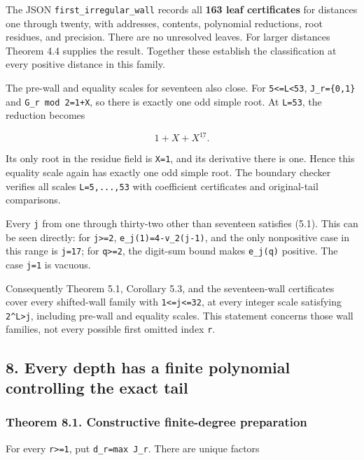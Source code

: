 \documentclass[11pt,letterpaper]{article}
\begin{document}
The JSON \texttt{first\_irregular\_wall} records all \textbf{163 leaf certificates} for distances one through twenty, with addresses, contents, polynomial reductions, root residues, and precision. There are no unresolved leaves. For larger distances Theorem 4.4 supplies the result. Together these establish the classification at every positive distance in this family.

The pre-wall and equality scales for seventeen also close. For \texttt{5\textless{}=L\textless{}53}, \texttt{J\_r=\{0,1\}} and \texttt{G\_r\ mod\ 2=1+X}, so there is exactly one odd simple root. At \texttt{L=53}, the reduction becomes

\[
1+X+X^{\underline{17}}.
\]

Its only root in the residue field is \texttt{X=1}, and its derivative there is one. Hence this equality scale again has exactly one odd simple root. The boundary checker verifies all scales \texttt{L=5,...,53} with coefficient certificates and original-tail comparisons.

Every \texttt{j} from one through thirty-two other than seventeen satisfies (5.1). This can be seen directly: for \texttt{j\textgreater{}=2}, \texttt{e\_j(1)=4-v\_2(j-1)}, and the only nonpositive case in this range is \texttt{j=17}; for \texttt{q\textgreater{}=2}, the digit-sum bound makes \texttt{e\_j(q)} positive. The case \texttt{j=1} is vacuous.

Consequently Theorem 5.1, Corollary 5.3, and the seventeen-wall certificates cover every shifted-wall family with \texttt{1\textless{}=j\textless{}=32}, at every integer scale satisfying \texttt{2\^{}L\textgreater{}j}, including pre-wall and equality scales. This statement concerns those wall families, not every possible first omitted index \texttt{r}.

\subsection{8. Every depth has a finite polynomial controlling the exact tail}\label{every-depth-has-a-finite-polynomial-controlling-the-exact-tail}

\subsubsection{Theorem 8.1. Constructive finite-degree preparation}\label{theorem-8.1.-constructive-finite-degree-preparation}

For every \texttt{r\textgreater{}=1}, put \texttt{d\_r=max\ J\_r}. There are unique factors
\end{document}
